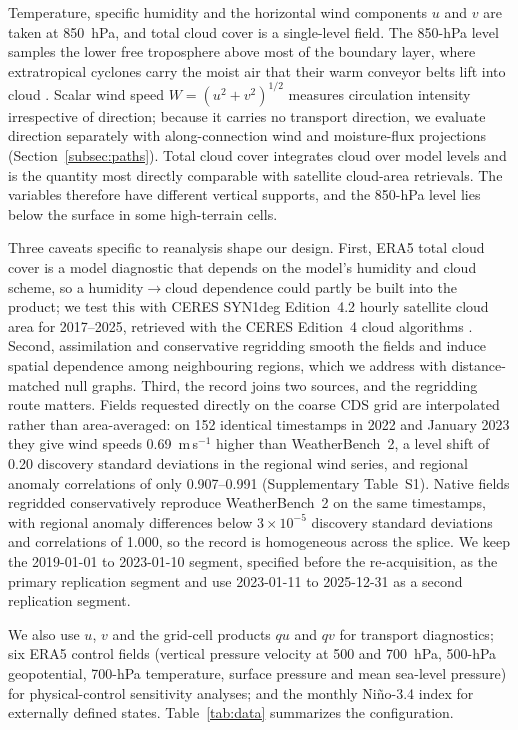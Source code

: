 \documentclass[preprint,12pt]{elsarticle}
\begin{document}
Temperature, specific humidity and the horizontal wind components $u$ and $v$ are taken at 850~hPa, and total cloud cover is a single-level field. The 850-hPa level samples the lower free troposphere above most of the boundary layer, where extratropical cyclones carry the moist air that their warm conveyor belts lift into cloud \citep{Heitmann2024WCB}. Scalar wind speed $W=(u^2+v^2)^{1/2}$ measures circulation intensity irrespective of direction; because it carries no transport direction, we evaluate direction separately with along-connection wind and moisture-flux projections (Section~\ref{subsec:paths}). Total cloud cover integrates cloud over model levels and is the quantity most directly comparable with satellite cloud-area retrievals. The variables therefore have different vertical supports, and the 850-hPa level lies below the surface in some high-terrain cells.

Three caveats specific to reanalysis shape our design. First, ERA5 total cloud cover is a model diagnostic that depends on the model's humidity and cloud scheme, so a humidity$\rightarrow$cloud dependence could partly be built into the product; we test this with CERES SYN1deg Edition~4.2 hourly satellite cloud area for 2017--2025, retrieved with the CERES Edition~4 cloud algorithms \citep{Minnis2021CERES}. Second, assimilation and conservative regridding smooth the fields and induce spatial dependence among neighbouring regions, which we address with distance-matched null graphs. Third, the record joins two sources, and the regridding route matters. Fields requested directly on the coarse CDS grid are interpolated rather than area-averaged: on 152 identical timestamps in 2022 and January 2023 they give wind speeds 0.69~m\,s$^{-1}$ higher than WeatherBench~2, a level shift of 0.20 discovery standard deviations in the regional wind series, and regional anomaly correlations of only 0.907--0.991 (Supplementary Table~S1). Native fields regridded conservatively reproduce WeatherBench~2 on the same timestamps, with regional anomaly differences below $3\times10^{-5}$ discovery standard deviations and correlations of 1.000, so the record is homogeneous across the splice. We keep the 2019-01-01 to 2023-01-10 segment, specified before the re-acquisition, as the primary replication segment and use 2023-01-11 to 2025-12-31 as a second replication segment.

We also use $u$, $v$ and the grid-cell products $qu$ and $qv$ for transport diagnostics; six ERA5 control fields (vertical pressure velocity at 500 and 700~hPa, 500-hPa geopotential, 700-hPa temperature, surface pressure and mean sea-level pressure) for physical-control sensitivity analyses; and the monthly Ni\~no-3.4 index for externally defined states. Table~\ref{tab:data} summarizes the configuration.
\end{document}
